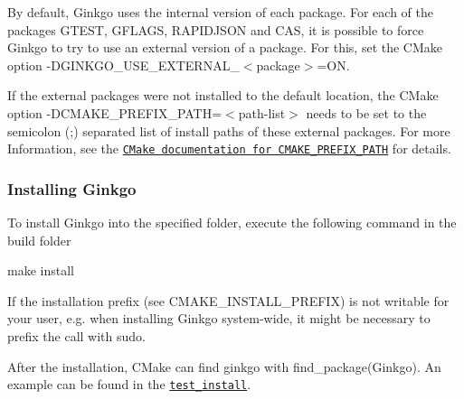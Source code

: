 By default, Ginkgo uses the internal version of each package. For each of the packages {\ttfamily G\+T\+E\+ST}, {\ttfamily G\+F\+L\+A\+GS}, {\ttfamily R\+A\+P\+I\+D\+J\+S\+ON} and {\ttfamily C\+AS}, it is possible to force Ginkgo to try to use an external version of a package. For this, set the C\+Make option {\ttfamily -\/\+D\+G\+I\+N\+K\+G\+O\+\_\+\+U\+S\+E\+\_\+\+E\+X\+T\+E\+R\+N\+A\+L\+\_\+$<$package$>$=ON}.

If the external packages were not installed to the default location, the C\+Make option {\ttfamily -\/\+D\+C\+M\+A\+K\+E\+\_\+\+P\+R\+E\+F\+I\+X\+\_\+\+P\+A\+TH=$<$path-\/list$>$} needs to be set to the semicolon ({\ttfamily ;}) separated list of install paths of these external packages. For more Information, see the \href{https://cmake.org/cmake/help/v3.9/variable/CMAKE_PREFIX_PATH.html}{\tt C\+Make documentation for C\+M\+A\+K\+E\+\_\+\+P\+R\+E\+F\+I\+X\+\_\+\+P\+A\+TH} for details.

\subsubsection*{Installing Ginkgo}

To install Ginkgo into the specified folder, execute the following command in the build folder


\begin{DoxyCode}
make install
\end{DoxyCode}


If the installation prefix (see {\ttfamily C\+M\+A\+K\+E\+\_\+\+I\+N\+S\+T\+A\+L\+L\+\_\+\+P\+R\+E\+F\+IX}) is not writable for your user, e.\+g. when installing Ginkgo system-\/wide, it might be necessary to prefix the call with {\ttfamily sudo}.

After the installation, C\+Make can find ginkgo with {\ttfamily find\+\_\+package(\+Ginkgo)}. An example can be found in the \href{test_install/CMakeLists.txt}{\tt {\ttfamily test\+\_\+install}}. 